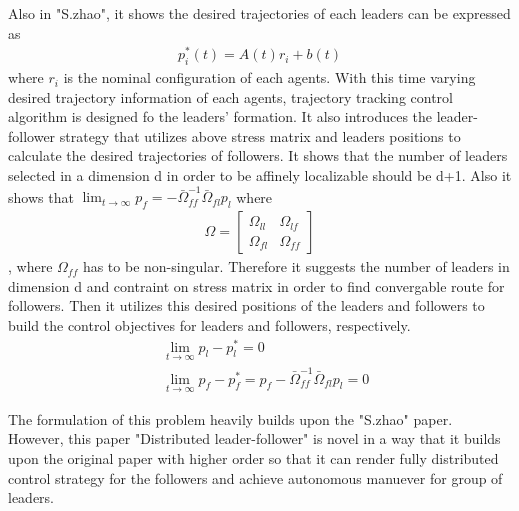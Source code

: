 Also in "S.zhao", it shows the desired trajectories of each leaders can be expressed as 
\begin{align*}
    p_i^* (t) = A(t) r_i + b(t)
\end{align*}
where $r_i$ is the nominal configuration of each agents. With this time varying desired trajectory information of each agents, trajectory tracking control algorithm is designed fo the leaders' formation. It also introduces the leader-follower strategy that utilizes above stress matrix and leaders positions to calculate the desired trajectories of followers. It shows that the number of leaders selected in a dimension d in order to be affinely localizable should be d+1. Also it shows that $\lim_{t\rightarrow \infty}p_f = - \bar \Omega_{ff}^{-1} \bar \Omega_{fl} p_l$ where 
\begin{align*}
    \Omega = \begin{bmatrix}
    \Omega_{ll} & \Omega_{lf}\\
    \Omega_{fl} & \Omega_{ff}
    \end{bmatrix}
\end{align*}, where $\Omega_{ff}$ has to be non-singular. Therefore it suggests the number of leaders in dimension d and contraint on stress matrix in order to find convergable route for followers. Then it utilizes this desired positions of the leaders and followers to build the control objectives for leaders and followers, respectively.
\begin{align*}
    &\lim_{t\rightarrow \infty} p_l - p_l^* = 0\\
    &\lim_{t\rightarrow \infty} p_f - p_f^*= p_f - \bar \Omega_{ff}^{-1} \bar \Omega_{fl} p_l = 0
\end{align*}

The formulation of this problem heavily builds upon the "S.zhao" paper. However, this paper "Distributed leader-follower" is novel in a way that it builds upon the original paper with higher order so that it can render fully distributed control strategy for the followers and achieve autonomous manuever for group of leaders.

